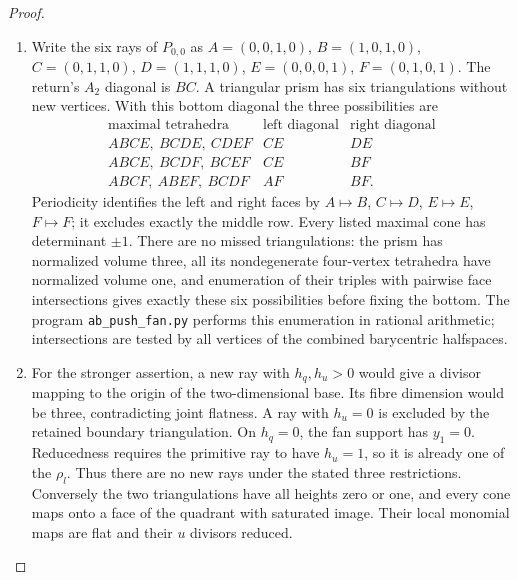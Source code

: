 \begin{proof}
\begin{enumerate}[label=\arabic*.,leftmargin=*]
\item Write the six rays of $P_{0,0}$ as
$A=(0,0,1,0)$, $B=(1,0,1,0)$, $C=(0,1,1,0)$,
$D=(1,1,1,0)$, $E=(0,0,0,1)$, $F=(0,1,0,1)$.
The return's $A_2$ diagonal is $BC$. A triangular prism has six
triangulations without new vertices. With this bottom diagonal
the three possibilities are
\[
\begin{array}{c|c|c}
\text{maximal tetrahedra}&\text{left diagonal}&\text{right diagonal}\\\hline
ABCE,\ BCDE,\ CDEF&CE&DE\\
ABCE,\ BCDF,\ BCEF&CE&BF\\
ABCF,\ ABEF,\ BCDF&AF&BF.
\end{array}
\]
Periodicity identifies the left and right faces by $A\mapsto B$,
$C\mapsto D$, $E\mapsto E$, $F\mapsto F$; it excludes exactly
the middle row. Every listed maximal cone has determinant $\pm1$.
There are no missed triangulations: the prism has normalized volume
three, all its nondegenerate four-vertex tetrahedra have normalized
volume one, and enumeration of their triples with pairwise
face intersections gives exactly these six possibilities before
fixing the bottom. The program \texttt{ab\_push\_fan.py} performs
this enumeration in rational arithmetic; intersections are tested
by all vertices of the combined barycentric halfspaces.

\item For the stronger assertion, a new ray with $h_q,h_u>0$ would
give a divisor mapping to the origin of the two-dimensional base.
Its fibre dimension would be three, contradicting joint flatness.
A ray with $h_u=0$ is excluded by the retained boundary
triangulation. On $h_q=0$, the fan support has $y_1=0$.
Reducedness requires the primitive ray to have $h_u=1$, so it
is already one of the $\rho_l$. Thus there are no new rays under
the stated three restrictions. Conversely the two triangulations
have all heights zero or one, and every cone maps onto a face of
the quadrant with saturated image. Their local monomial maps
are flat and their $u$ divisors reduced.


\end{enumerate}
\end{proof}

